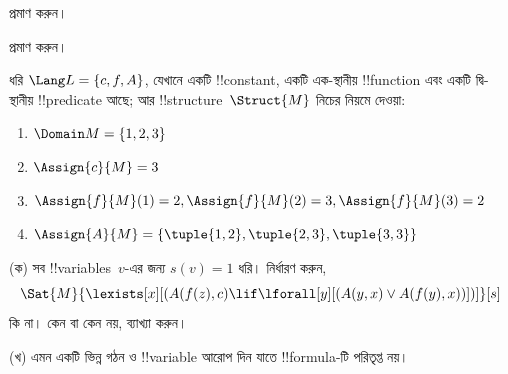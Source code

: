 \documentclass[../../../include/open-logic-section]{subfiles}
\begin{document}

\begin{prob}
   প্রমাণ করুন।
\end{prob}
\tagendprob


\begin{prob}
   প্রমাণ করুন।
\end{prob}
\tagendprob

\begin{prob}
ধরি $\Lang L = \{c, f, A\}$, যেখানে একটি !!{constant}, একটি
এক-স্থানীয় !!{function} এবং একটি দ্বি-স্থানীয় !!{predicate} আছে;
আর !!{structure}~$\Struct{M}$ নিচের নিয়মে দেওয়া:
\begin{enumerate}
\item $\Domain M = \{1, 2, 3\}$
\item $\Assign{c}{M} = 3$
\item $\Assign{f}{M}(1) = 2, \Assign{f}{M}(2) = 3, \Assign{f}{M}(3) = 2$
\item $\Assign{A}{M} = \{\tuple{1, 2}, \tuple{2, 3}, \tuple{3, 3}\}$
\end{enumerate}
(ক) সব !!{variable}s~$v$-এর জন্য $s(v) = 1$ ধরি। নির্ধারণ করুন,
\[
\Sat{M}{\lexists[x][(A(f(z), c) \lif \lforall[y][(A(y, x) \lor A(f(y),
      x))])]}[s]
\]
কি না। কেন বা কেন নয়, ব্যাখ্যা করুন।

(খ) এমন একটি ভিন্ন গঠন ও !!{variable} আরোপ দিন যাতে !!{formula}-টি
পরিতৃপ্ত নয়।
\end{prob}
\end{document}
